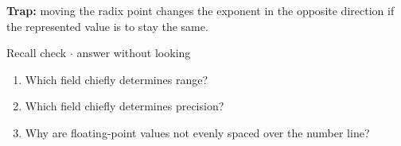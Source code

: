 \documentclass[11pt]{article}
\begin{document}
\begin{keepsection}
\begin{keepsection}
\begin{notebox}\textbf{Trap:} moving the radix point changes the exponent in the opposite direction if the represented value is to stay the same.\end{notebox}

\begin{recallbox}{Recall check \ensuremath{\cdot} answer without looking}
\begin{enumerate}
\item Which field chiefly determines range?
\item Which field chiefly determines precision?
\item Why are floating-point values not evenly spaced over the number line?
\end{enumerate}

\end{recallbox}
\end{keepsection}
\end{keepsection}
\end{document}
